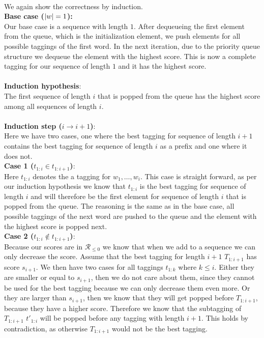 \documentclass[a4paper,12pt]{ETHexercise}
\begin{document}
\begin{question}\\
	\begin{subquestion}
		We again show the correctness by induction.\\

		\textbf{Base case ($|\boldmath{w}|=1$):}\\
		Our base case is a sequence with length $1$. After dequeueing the first element from the queue, which is the initialization element, we push elements for all possible taggings of the first word. In the next iteration, due to the priority queue structure we dequeue the element with the highest score. This is now a complete tagging for our sequence of length $1$ and it has the highest score.\\\\
		\textbf{Induction hypothesis}:\\
		The first sequence of length $i$ that is popped from the queue has the highest score among all sequences of length $i$.\\\\
		\textbf{Induction step ($i \rightarrow i+1$)}:\\
		Here we have two cases, one where the best tagging for sequence of length $i+1$ contains the best tagging for sequence of length $i$ as a prefix and one where it does not.\\
		\textbf{Case 1 ($t_{1:i} \in t_{1:i+1}$)}:\\
		Here $t_{1:i}$ denotes the a tagging for $w_1, \dots, w_i$.
		This case is straight forward, as per our induction hypothesis we know that $t_{1:i}$ is the best tagging for sequence of length $i$ and will therefore be the first element for sequence of length $i$ that is popped from the queue. The reasoning is the same as in the base case, all possible taggings of the next word are pushed to the queue and the element with the highest score is popped next.\\
		\textbf{Case 2 ($t_{1:i} \notin t_{1:i+1}$)}:\\
		Because our scores are in $\mathcal{R}_{\leq 0}$ we know that when we add to a sequence we can only decrease the score. Assume that the best tagging for length $i+1$ $T_{1:i+1}$ has score $s_{i+1}$. We then have two cases for all taggings $t_{1:k}$ where $k \leq i$. Either they are smaller or equal to $s_{i+1}$, then we do not care about them, since they cannot be used for the best tagging because we can only decrease them even more. Or they are larger than $s_{i+1}$, then we know that they will get popped before $T_{1:i+1}$, because they have a higher score. Therefore we know that the subtagging of $T_{1:i+1}$ $t'_{1:i}$ will be popped before any tagging with length $i+1$. This holds by contradiction, as otherwise $T_{1:i+1}$ would not be the best tagging.

\end{subquestion}
\end{question}
\end{document}
